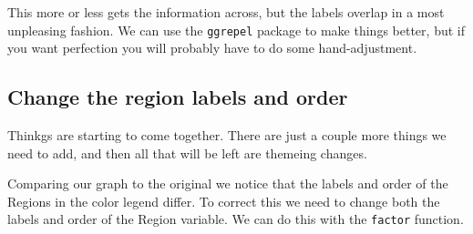 \documentclass[]{book}
\newenvironment{Shaded}{\begin{snugshade}}{\end{snugshade}}
\newcommand{\KeywordTok}[1]{\textcolor[rgb]{0.13,0.29,0.53}{\textbf{#1}}}
\newcommand{\DataTypeTok}[1]{\textcolor[rgb]{0.13,0.29,0.53}{#1}}
\newcommand{\DecValTok}[1]{\textcolor[rgb]{0.00,0.00,0.81}{#1}}
\newcommand{\CharTok}[1]{\textcolor[rgb]{0.31,0.60,0.02}{#1}}
\newcommand{\StringTok}[1]{\textcolor[rgb]{0.31,0.60,0.02}{#1}}
\newcommand{\OperatorTok}[1]{\textcolor[rgb]{0.81,0.36,0.00}{\textbf{#1}}}
\newcommand{\NormalTok}[1]{#1}
\begin{document}
This more or less gets the information across, but the labels overlap in
a most unpleasing fashion. We can use the \texttt{ggrepel} package to
make things better, but if you want perfection you will probably have to
do some hand-adjustment.

\begin{Shaded}
\end{Shaded}

\subsection{Change the region labels and
order}\label{change-the-region-labels-and-order}

Thinkgs are starting to come together. There are just a couple more
things we need to add, and then all that will be left are themeing
changes.

Comparing our graph to the original we notice that the labels and order
of the Regions in the color legend differ. To correct this we need to
change both the labels and order of the Region variable. We can do this
with the \texttt{factor} function.

\begin{Shaded}
\end{Shaded}
\end{document}
